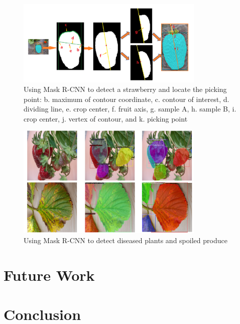 \documentclass[12pt]{article}
\begin{document}
\begin{figure}[h]
\centering
\includegraphics[width=0.80\textwidth]{locStem.PNG}
\caption{Using Mask R-CNN to detect a strawberry and locate the picking point: b. maximum of contour coordinate, c. contour of interest, d. dividing line, e. crop center, f. fruit axis, g. sample A, h. sample B, i. crop center, j. vertex of contour, and k. picking point~\cite{yu2019fruit}}
\end{figure}

\begin{figure}[h]
\centering
\includegraphics[width=0.80\textwidth]{dp6.png}
\caption{Using Mask R-CNN to detect diseased plants and spoiled produce~\cite{afzaal2021instance}}
\end{figure}


\section{Future Work}

\section{Conclusion}



\end{document}
